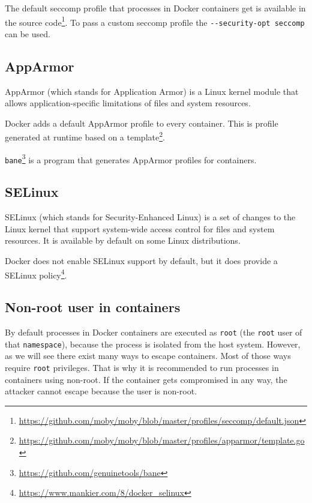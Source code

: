 \hfill

The default seccomp profile that processes in Docker containers get is available in the source code\footnote{\url{https://github.com/moby/moby/blob/master/profiles/seccomp/default.json}}. To pass a custom seccomp profile the \lstinline{--security-opt seccomp} can be used.


\subsection{AppArmor}
AppArmor (which stands for Application Armor) is a Linux kernel module that allows application-specific limitations of files and system resources.

\hfill

Docker adds a default AppArmor profile to every container. This is profile generated at runtime based on a template\footnote{\url{https://github.com/moby/moby/blob/master/profiles/apparmor/template.go}}.

\hfill

\lstinline{bane}\footnote{\url{https://github.com/genuinetools/bane}} is a program that generates AppArmor profiles for containers.

\subsection{SELinux}
SELinux (which stands for Security-Enhanced Linux) is a set of changes to the Linux kernel that support system-wide access control for files and system resources. It is available by default on some Linux distributions.

\hfill

Docker does not enable SELinux support by default, but it does provide a SELinux policy\footnote{\url{https://www.mankier.com/8/docker_selinux}}.

\subsection{Non-root user in containers}\label{subsection:non-root-user}
By default processes in Docker containers are executed as \lstinline{root} (the \lstinline{root} user of that \lstinline{namespace}), because the process is isolated from the host system. However, as we will see there exist many ways to escape containers. Most of those ways require \lstinline{root} privileges. That is why it is recommended to run processes in containers using non-root. If the container gets compromised in any way, the attacker cannot escape because the user is non-root.
